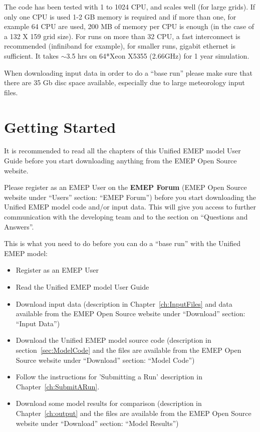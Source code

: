 The code has been tested with 1 to 1024 CPU, and scales well (for large grids).  If only one 
CPU is used 1-2 GB memory is required and if more than one,
for example 64 CPU are used, 200 MB of memory per CPU is enough (in
the case of a 132 X 159 grid size). For runs on more than 32 CPU, a fast interconnect is 
recommended (infiniband for example), for smaller runs, gigabit ethernet is sufficient. 
It takes $\sim$3.5 hrs on 64*Xeon X5355 (2.66GHz) for 1 year simulation.

When downloading input data in order to do a ``base run'' please make
sure that there are 35 Gb disc space available, especially due to
large meteorology input files.

 

\section{Getting Started}


It is recommended to read all the chapters of this Unified EMEP model
User Guide before you start downloading anything from the EMEP Open
Source website.

Please register as an EMEP User on the {\bf EMEP Forum}
(EMEP Open Source website under ``Users'' section: ``EMEP Forum'')
before you start downloading the Unified EMEP model code and/or input
data. This will give you access to further communication with the
developing team and to the section on ``Questions and Answers''. 


This is what you need to do before you can do a ``base run'' with the
Unified EMEP model:

\begin{itemize}
\item Register as an EMEP User
\item Read the Unified EMEP model User Guide
\item
Download input data (description in Chapter~\ref{ch:InputFiles} and
data available from the EMEP Open Source website under ``Download''
section: ``Input Data'')
\item
Download the Unified EMEP model source code (description in 
section~\ref{sec:ModelCode} and the files are available from the EMEP 
Open Source website under ``Download'' section: ``Model Code'')
\item
Follow the instructions for 'Submitting a Run' description in
Chapter~\ref{ch:SubmitARun}.%
\item
Download some model results for comparison (description in
Chapter~\ref{ch:output} and the files are available from the EMEP 
Open Source website under ``Download'' section: ``Model Results'')
\end{itemize}

